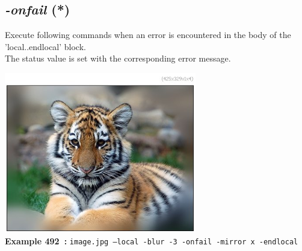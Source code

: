 \documentclass[a4paper,11pt,twoside]{book}
\begin{document}
\subsection{\emph{-onfail} (*)}\vspace*{-0.5em}
Execute following commands when an error is encountered in the body of the 'local..endlocal' block.
~\\The status value is set with the corresponding error message.
\begin{center}\includegraphics[keepaspectratio=true,height=7cm,width=\textwidth]{img/gmic_def492.jpg}\\
{\footnotesize \textbf{Example 492~:} \texttt{image.jpg --local -blur -3 -onfail -mirror x -endlocal}}
\end{center}
\end{document}
